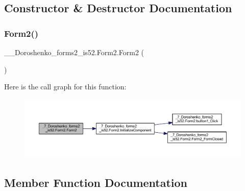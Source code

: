 \subsection{Constructor \& Destructor Documentation}
\hypertarget{class__7___doroshenko__forms2__is52_1_1_form2_ad9bec3da2232afd6c01a52bcae6f18d0}{}\label{class__7___doroshenko__forms2__is52_1_1_form2_ad9bec3da2232afd6c01a52bcae6f18d0} 
\subsubsection{\texorpdfstring{Form2()}{Form2()}}
{\footnotesize\ttfamily \+\_\+\_\+\+Doroshenko\+\_\+forms2\+\_\+is52.\+Form2.\+Form2 (\begin{DoxyParamCaption}{ }\end{DoxyParamCaption})}

Here is the call graph for this function\+:
\nopagebreak
\begin{figure}[H]
\begin{center}
\leavevmode
\includegraphics[width=350pt]{class__7___doroshenko__forms2__is52_1_1_form2_ad9bec3da2232afd6c01a52bcae6f18d0_cgraph}
\end{center}
\end{figure}


\subsection{Member Function Documentation}
\hypertarget{class__7___doroshenko__forms2__is52_1_1_form2_af791f000673bcc783827356e3fae5ce8}{}\label{class__7___doroshenko__forms2__is52_1_1_form2_af791f000673bcc783827356e3fae5ce8} 
